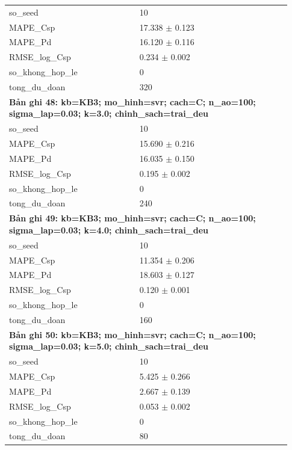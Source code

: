\begin{longtable}{p{0.43\linewidth}p{0.50\linewidth}}
so\_\allowbreak seed & 10 \\
MAPE\_\allowbreak Csp & 17.338 $\pm$ 0.123 \\
MAPE\_\allowbreak Pd & 16.120 $\pm$ 0.116 \\
RMSE\_\allowbreak log\_\allowbreak Csp & 0.234 $\pm$ 0.002 \\
so\_\allowbreak khong\_\allowbreak hop\_\allowbreak le & 0 \\
tong\_\allowbreak du\_\allowbreak doan & 320 \\
\midrule
\multicolumn{2}{p{0.95\linewidth}}{\textbf{Bản ghi 48: kb=KB3; mo\_hinh=svr; cach=C; n\_ao=100; sigma\_lap=0.03; k=3.0; chinh\_sach=trai\_deu}} \\
so\_\allowbreak seed & 10 \\
MAPE\_\allowbreak Csp & 15.690 $\pm$ 0.216 \\
MAPE\_\allowbreak Pd & 16.035 $\pm$ 0.150 \\
RMSE\_\allowbreak log\_\allowbreak Csp & 0.195 $\pm$ 0.002 \\
so\_\allowbreak khong\_\allowbreak hop\_\allowbreak le & 0 \\
tong\_\allowbreak du\_\allowbreak doan & 240 \\
\midrule
\multicolumn{2}{p{0.95\linewidth}}{\textbf{Bản ghi 49: kb=KB3; mo\_hinh=svr; cach=C; n\_ao=100; sigma\_lap=0.03; k=4.0; chinh\_sach=trai\_deu}} \\
so\_\allowbreak seed & 10 \\
MAPE\_\allowbreak Csp & 11.354 $\pm$ 0.206 \\
MAPE\_\allowbreak Pd & 18.603 $\pm$ 0.127 \\
RMSE\_\allowbreak log\_\allowbreak Csp & 0.120 $\pm$ 0.001 \\
so\_\allowbreak khong\_\allowbreak hop\_\allowbreak le & 0 \\
tong\_\allowbreak du\_\allowbreak doan & 160 \\
\midrule
\multicolumn{2}{p{0.95\linewidth}}{\textbf{Bản ghi 50: kb=KB3; mo\_hinh=svr; cach=C; n\_ao=100; sigma\_lap=0.03; k=5.0; chinh\_sach=trai\_deu}} \\
so\_\allowbreak seed & 10 \\
MAPE\_\allowbreak Csp & 5.425 $\pm$ 0.266 \\
MAPE\_\allowbreak Pd & 2.667 $\pm$ 0.139 \\
RMSE\_\allowbreak log\_\allowbreak Csp & 0.053 $\pm$ 0.002 \\
so\_\allowbreak khong\_\allowbreak hop\_\allowbreak le & 0 \\
tong\_\allowbreak du\_\allowbreak doan & 80 \\
\midrule
\bottomrule
\end{longtable}
